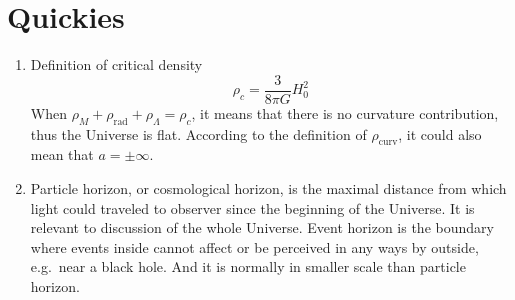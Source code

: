 \section{Quickies}
\begin{enumerate}[label=(\alph*)]
   \item Definition of critical density
      \begin{equation}
         \rho_c = \frac{3 }{8\pi G}H_0^2
      \end{equation}
      When $\rho_{M} + \rho_\text{rad} + \rho_{\Lambda} = \rho_c$, it means that there is no curvature contribution, thus the Universe is flat. According to the definition of $\rho_\text{curv}$, it could also mean that $a = \pm \infty$.
   \item Particle horizon, or cosmological horizon, is the maximal distance from which light could traveled to observer since the beginning of the Universe\cite{wiki:partHor}. It is relevant to discussion of the whole Universe. Event horizon is the boundary where events inside cannot affect or be perceived in any ways by outside, e.g.~near a black hole. And it is normally in smaller scale than particle horizon.
\end{enumerate}
